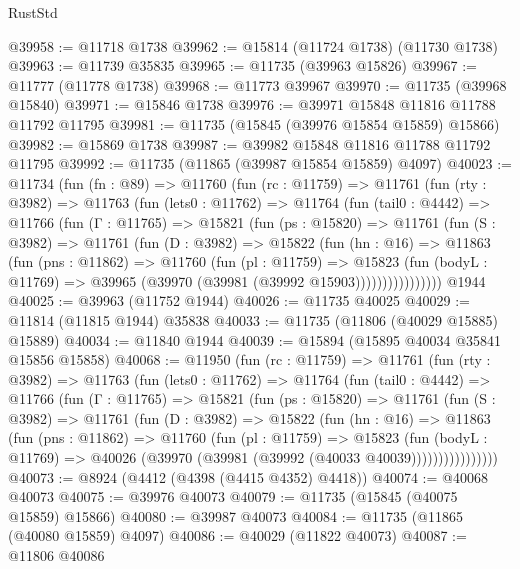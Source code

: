 \begin{lexlean}{RustStd}
\begin{coremodule}
@39958 := @11718 @1738
@39962 := @15814 (@11724 @1738) (@11730 @1738)
@39963 := @11739 @35835
@39965 := @11735 (@39963 @15826)
@39967 := @11777 (@11778 @1738)
@39968 := @11773 @39967
@39970 := @11735 (@39968 @15840)
@39971 := @15846 @1738
@39976 := @39971 @15848 @11816 @11788 @11792 @11795
@39981 := @11735 (@15845 (@39976 @15854 @15859) @15866)
@39982 := @15869 @1738
@39987 := @39982 @15848 @11816 @11788 @11792 @11795
@39992 := @11735 (@11865 (@39987 @15854 @15859) @4097)
@40023 := @11734
    (fun (fn : @89) =>
    @11760
      (fun (rc : @11759) =>
      @11761
        (fun (rty : @3982) =>
        @11763
          (fun (lets0 : @11762) =>
          @11764
            (fun (tail0 : @4442) =>
            @11766
              (fun (Γ : @11765) =>
              @15821
                (fun (ps : @15820) =>
                @11761
                  (fun (S : @3982) =>
                  @11761
                    (fun (D : @3982) =>
                    @15822
                      (fun (hn : @16) =>
                      @11863
                        (fun (pns : @11862) =>
                        @11760
                          (fun (pl : @11759) =>
                          @15823
                            (fun (bodyL : @11769) =>
                            @39965 (@39970 (@39981 (@39992 @15903))))))))))))))))
    @1944
@40025 := @39963 (@11752 @1944)
@40026 := @11735 @40025
@40029 := @11814 (@11815 @1944) @35838
@40033 := @11735 (@11806 (@40029 @15885) @15889)
@40034 := @11840 @1944
@40039 := @15894 (@15895 @40034 @35841 @15856 @15858)
@40068 := @11950
    (fun (rc : @11759) =>
    @11761
      (fun (rty : @3982) =>
      @11763
        (fun (lets0 : @11762) =>
        @11764
          (fun (tail0 : @4442) =>
          @11766
            (fun (Γ : @11765) =>
            @15821
              (fun (ps : @15820) =>
              @11761
                (fun (S : @3982) =>
                @11761
                  (fun (D : @3982) =>
                  @15822
                    (fun (hn : @16) =>
                    @11863
                      (fun (pns : @11862) =>
                      @11760
                        (fun (pl : @11759) =>
                        @15823
                          (fun (bodyL : @11769) =>
                          @40026 (@39970 (@39981 (@39992 (@40033 @40039))))))))))))))))
@40073 := @8924 (@4412 (@4398 (@4415 @4352) @4418))
@40074 := @40068 @40073
@40075 := @39976 @40073
@40079 := @11735 (@15845 (@40075 @15859) @15866)
@40080 := @39987 @40073
@40084 := @11735 (@11865 (@40080 @15859) @4097)
@40086 := @40029 (@11822 @40073)
@40087 := @11806 @40086

\end{coremodule}
\end{lexlean}
